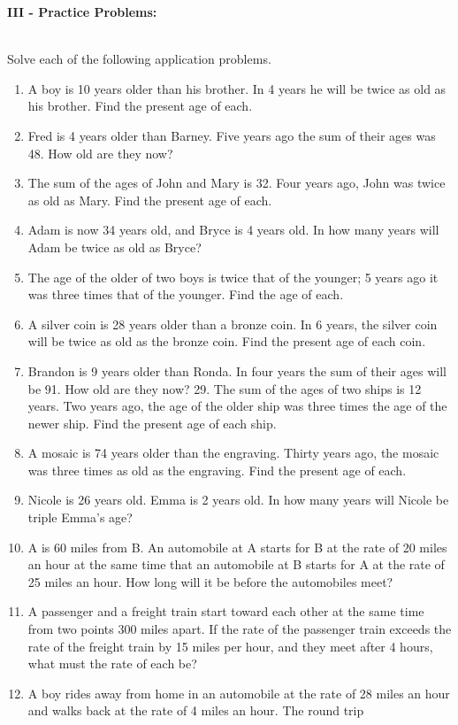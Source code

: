 \documentclass[12pt]{article}
\theoremstyle{definition}
\begin{document}
{\bf III - Practice Problems:}\\
\ \par
Solve each of the following application problems.
\begin{enumerate}
\item A boy is 10 years older than his brother. In 4 years he will be twice as old as his brother. Find the present age of each.
\item Fred is 4 years older than Barney. Five years ago the sum of their ages was 48. How old are they now?
\item The sum of the ages of John and Mary is 32. Four years ago, John was twice as 
old as Mary. Find the present age of each.
\item Adam is now 34 years old, and Bryce is 4 years old. In how many years will Adam be twice as old as Bryce?
\item The age of the older of two boys is twice that of the younger; 5 years ago it was three times that of the younger. Find the age of
each.
\item A silver coin is 28 years older than a bronze coin. In 6 years, the silver coin will be twice as old as the bronze coin. Find the
present age of each coin.
\item Brandon is 9 years older than Ronda. In four years the sum of their ages will be 91. How old are they now?
29. The sum of the ages of two ships is 12 years. Two years ago, the age of the older ship was three times the age of the newer ship.
Find the present age of each ship.
\item A mosaic is 74 years older than the engraving. Thirty years ago, the mosaic was three times as old as the engraving. Find the
present age of each.
\item Nicole is 26 years old. Emma is 2 years old. In how many years will Nicole be triple Emma's age?
\item A is 60 miles from B. An automobile at A starts for B at the rate of 20 miles an hour at the same time that an automobile at B starts
for A at the rate of 25 miles an hour. How long will it be before the automobiles meet?
\item A passenger and a freight train start toward each other at the same time from two points 300 miles apart. If the rate of the passenger train
exceeds the rate of the freight train by 15 miles per hour, and they meet after 4 hours, what must the rate of each be?
\item A boy rides away from home in an automobile at the rate of 28 miles an hour and walks back at the rate of 4 miles an hour. The round trip

\end{enumerate}
\end{document}

